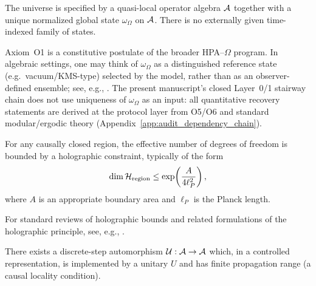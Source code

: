 \begin{axiom}
The universe is specified by a quasi-local operator algebra $\mathcal{A}$ together with a unique normalized global state $\omega_\Omega$ on $\mathcal{A}$. There is no externally given time-indexed family of states.
\end{axiom}
\begin{remark}
Axiom~O1 is a constitutive postulate of the broader HPA--$\Omega$ program. In algebraic settings, one may think of $\omega_\Omega$ as a distinguished reference state (e.g.\ vacuum/KMS-type) selected by the model, rather than as an observer-defined ensemble; see, e.g., \cite{Haag1996,BratteliRobinson1997}.
The present manuscript's closed Layer~0/1 stairway chain does not use uniqueness of $\omega_\Omega$ as an input: all quantitative recovery statements are derived at the protocol layer from O5/O6 and standard modular/ergodic theory (Appendix~\ref{app:audit_dependency_chain}).
\end{remark}

\begin{axiom}
For any causally closed region, the effective number of degrees of freedom is bounded by a holographic constraint, typically of the form
\begin{equation}
\dim \mathcal{H}_{\mathrm{region}} \le \exp\!\left(\frac{A}{4\ell_P^2}\right),
\end{equation}
where $A$ is an appropriate boundary area and $\ell_P$ is the Planck length.
\end{axiom}
\begin{remark}
For standard reviews of holographic bounds and related formulations of the holographic principle, see, e.g., \cite{Bousso2002}.
\end{remark}

\begin{axiom}
There exists a discrete-step automorphism $\mathcal{U}:\mathcal{A}\to\mathcal{A}$ which, in a controlled representation, is implemented by a unitary $U$ and has finite propagation range (a causal locality condition).
\end{axiom}

